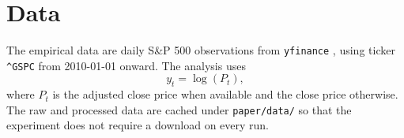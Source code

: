 \section{Data}
The empirical data are daily S\&P 500 observations from \texttt{yfinance}
\citep{yfinance}, using ticker \texttt{\string^GSPC} from 2010-01-01 onward.
The analysis uses
\[
  y_t = \log(P_t),
\]
where $P_t$ is the adjusted close price when available and the close price
otherwise. The raw and processed data are cached under \texttt{paper/data/} so
that the experiment does not require a download on every run.

